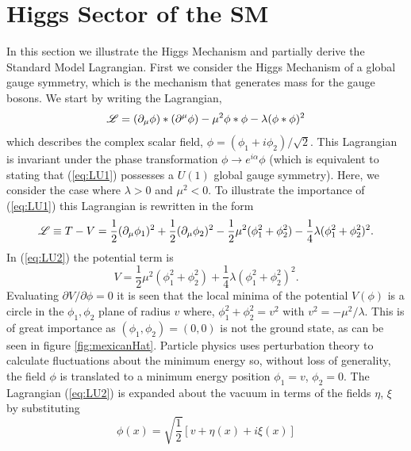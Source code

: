 \section{Higgs Sector of the SM}
In this section we illustrate the Higgs Mechanism and partially derive the
Standard Model Lagrangian. 
First we consider the Higgs Mechanism of a global gauge symmetry, 
which is the mechanism that generates mass for the gauge bosons. 
We start by writing the Lagrangian, 
\begin{equation}
\mathscr{L}=(\partial_{\mu}\phi)*(\partial^{\mu}\phi) - \mu^{2}\phi*\phi - \lambda (\phi*\phi)^{2}
\label{eq:LU1}
\end{equation}
which describes the complex scalar field, $\phi=(\phi_{1}+i\phi_{2})/\sqrt{2}$.
This Lagrangian is invariant under the phase transformation $\phi\rightarrow e^{i\alpha}\phi$
(which is equivalent to stating that (\ref{eq:LU1}) possesses a $U(1)$ global gauge symmetry).
Here, we consider the case where $\lambda>0$ and $\mu^{2}<0$. To illustrate the importance of (\ref{eq:LU1})
this Lagrangian is rewritten in the form
\begin{equation}
\mathscr{L} \equiv T-V = \frac{1}{2}(\partial_{\mu}\phi_{1})^{2}+\frac{1}{2}(\partial_{\mu}\phi_{2})^{2}-\frac{1}{2}\mu^{2}(\phi_{1}^{2}+\phi_{2}^{2})-\frac{1}{4}\lambda(\phi_{1}^{2}+\phi_{2}^{2})^{2}.
\label{eq:LU2}
\end{equation}
In (\ref{eq:LU2}) the potential term is
\begin{equation}
V=\frac{1}{2}\mu^{2}(\phi_{1}^{2}+\phi_{2}^{2})+\frac{1}{4}\lambda(\phi_{1}^{2}+\phi_{2}^{2})^{2}.
\end{equation}
Evaluating $\partial V/ \partial \phi = 0$ it is seen that the local minima
of the potential $V(\phi)$ is a circle in the $\phi_{1},\phi_{2}$ plane of radius $v$ where,
$\phi_{1}^{2}+\phi_{2}^{2}=v^{2}$ with $v^{2}= - \mu^{2}/\lambda$. This 
is of great importance as $(\phi_{1},\phi_{2})=(0,0)$ is not the ground state, as can be seen in figure \ref{fig:mexicanHat}.
Particle physics uses perturbation theory to calculate fluctuations 
about the minimum energy so, without loss of generality, the field $\phi$ is translated to a minimum
energy position $\phi_{1}=v$, $\phi_{2}=0$. The Lagrangian (\ref{eq:LU2}) is
expanded about the vacuum in terms of the fields $\eta$, $\xi$ by substituting
\begin{equation}
\phi(x)=\sqrt{\frac{1}{2}}[v+\eta(x)+i\xi(x)]
\label{eq:VTerms}
\end{equation}
